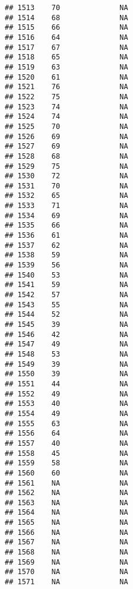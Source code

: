 \documentclass[]{article}
\newenvironment{Shaded}{\begin{snugshade}}{\end{snugshade}}
\newcommand{\DataTypeTok}[1]{\textcolor[rgb]{0.13,0.29,0.53}{#1}}
\newcommand{\KeywordTok}[1]{\textcolor[rgb]{0.13,0.29,0.53}{\textbf{#1}}}
\newcommand{\NormalTok}[1]{#1}
\newcommand{\OperatorTok}[1]{\textcolor[rgb]{0.81,0.36,0.00}{\textbf{#1}}}
\newcommand{\StringTok}[1]{\textcolor[rgb]{0.31,0.60,0.02}{#1}}
\begin{document}
\begin{verbatim}
## 1513    70              NA
## 1514    68              NA
## 1515    66              NA
## 1516    64              NA
## 1517    67              NA
## 1518    65              NA
## 1519    63              NA
## 1520    61              NA
## 1521    76              NA
## 1522    75              NA
## 1523    74              NA
## 1524    74              NA
## 1525    70              NA
## 1526    69              NA
## 1527    69              NA
## 1528    68              NA
## 1529    75              NA
## 1530    72              NA
## 1531    70              NA
## 1532    65              NA
## 1533    71              NA
## 1534    69              NA
## 1535    66              NA
## 1536    61              NA
## 1537    62              NA
## 1538    59              NA
## 1539    56              NA
## 1540    53              NA
## 1541    59              NA
## 1542    57              NA
## 1543    55              NA
## 1544    52              NA
## 1545    39              NA
## 1546    42              NA
## 1547    49              NA
## 1548    53              NA
## 1549    39              NA
## 1550    39              NA
## 1551    44              NA
## 1552    49              NA
## 1553    40              NA
## 1554    49              NA
## 1555    63              NA
## 1556    64              NA
## 1557    40              NA
## 1558    45              NA
## 1559    58              NA
## 1560    60              NA
## 1561    NA              NA
## 1562    NA              NA
## 1563    NA              NA
## 1564    NA              NA
## 1565    NA              NA
## 1566    NA              NA
## 1567    NA              NA
## 1568    NA              NA
## 1569    NA              NA
## 1570    NA              NA
## 1571    NA              NA
\end{verbatim}

\begin{Shaded}
\end{Shaded}

\begin{Shaded}
\end{Shaded}
\end{document}
